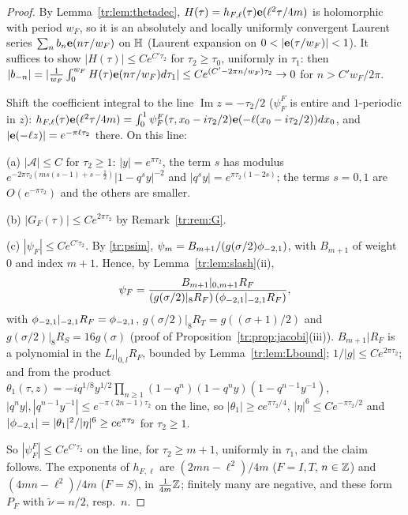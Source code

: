 \begin{proof}
By Lemma~\ref{tr:lem:thetadec}, $H(\tau)=h_{F,\ell}(\tau)\mathbf e(\ell^2\tau/4m)$ is holomorphic with period $w_F$, so it is an absolutely and locally uniformly convergent Laurent series $\sum_nb_n\mathbf e(n\tau/w_F)$ on $\mathbb{H}$ (Laurent expansion on $0<|\e(\tau/w_F)|<1$). It suffices to show $|H(\tau)|\le Ce^{C'\tau_2}$ for $\tau_2\ge\tau_0$, uniformly in $\tau_1$: then $|b_{-n}|=|\frac1{w_F}\int_0^{w_F}H(\tau)\mathbf e(n\tau/w_F)d\tau_1|\le Ce^{(C'-2\pi n/w_F)\tau_2}\to0$ for $n>C'w_F/2\pi$.

Shift the coefficient integral to the line $\operatorname{Im}z=-\tau_2/2$ ($\psi^F_F$ is entire and $1$-periodic in $z$): $h_{F,\ell}(\tau)\mathbf e(\ell^2\tau/4m)=\int_0^1\psi^F_F(\tau,x_0-i\tau_2/2)\mathbf e(-\ell(x_0-i\tau_2/2))dx_0$, and $|\mathbf e(-\ell z)|=e^{-\pi\ell\tau_2}$ there. On this line:

(a) $|\mathcal A|\le C$ for $\tau_2\ge1$: $|y|=e^{\pi\tau_2}$, the term $s$ has modulus $e^{-2\pi\tau_2(ms(s-1)+s-\frac12)}|1-q^sy|^{-2}$ and $|q^sy|=e^{\pi\tau_2(1-2s)}$; the terms $s=0,1$ are $O(e^{-\pi\tau_2})$ and the others are smaller.

(b) $|G_F(\tau)|\le Ce^{2\pi\tau_2}$ by Remark~\ref{tr:rem:G}.

(c) $|\psi_F|\le Ce^{C'\tau_2}$. By \eqref{tr:psim}, $\psi_m=B_{m+1}/(g(\sigma/2)\phi_{-2,1})$, with $B_{m+1}$ of weight $0$ and index $m+1$. Hence, by Lemma~\ref{tr:lem:slash}(ii),
\[
\psi_F=\frac{B_{m+1}|_{0,m+1}R_F}{(g(\sigma/2)|_8R_F)\,(\phi_{-2,1}|_{-2,1}R_F)},
\]
with $\phi_{-2,1}|_{-2,1}R_F=\phi_{-2,1}$, $g(\sigma/2)|_8R_T=g((\sigma+1)/2)$ and $g(\sigma/2)|_8R_S=16g(\sigma)$ (proof of Proposition~\ref{tr:prop:jacobi}(iii)). $B_{m+1}|R_F$ is a polynomial in the $L_l|_{0,l}R_F$, bounded by Lemma~\ref{tr:lem:Lbound}; $1/|g|\le Ce^{2\pi\tau_2}$; and from the product $\theta_1(\tau,z)=-iq^{1/8}y^{1/2}\prod_{n\ge1}(1-q^n)(1-q^ny)(1-q^{n-1}y^{-1})$, $|q^ny|,|q^{n-1}y^{-1}|\le e^{-\pi(2n-1)\tau_2}$ on the line, so $|\theta_1|\ge ce^{\pi\tau_2/4}$, $|\eta|^6\le Ce^{-\pi\tau_2/2}$ and $|\phi_{-2,1}|=|\theta_1|^2/|\eta|^6\ge ce^{\pi\tau_2}$ for $\tau_2\ge1$.

So $|\psi^F_F|\le Ce^{C'\tau_2}$ on the line, for $\tau_2\ge m+1$, uniformly in $\tau_1$, and the claim follows. The exponents of $h_{F,\ell}$ are $(2mn-\ell^2)/4m$ ($F=I,T$, $n\in\mathbb{Z}$) and $(4mn-\ell^2)/4m$ ($F=S$), in $\frac1{4m}\mathbb{Z}$; finitely many are negative, and these form $P_F$ with $\tilde\nu=n/2$, resp.\ $n$.
\end{proof}

